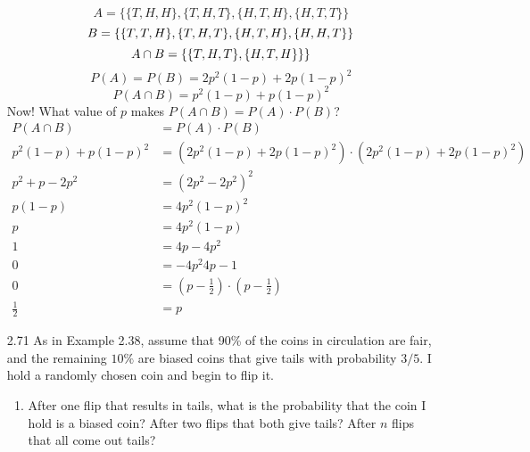 \documentclass[10pt]{article}
\begin{document}
\begin{itemize}
    \[ 
      A = \{ \{T,H,H\}, \{T,H,T\}, \{H,T,H\}, \{H,T,T \} \}
    \]
      \[
      B = \{ \{T,T,H\}, \{T,H,T\}, \{H,T,H\}, \{H,H,T \} \} \\
    \]
      \[
      A \cap B = \{ \{T,H,T\}, \{H,T,H\} \} \} \\
    \]
    \[ 
      P(A) = P(B) = 2p^2(1-p) + 2p(1-p)^2
    \]
    \[ 
      P(A \cap B) = p^2(1-p) + p(1-p)^2
    \]
    Now!  What value of $p$ makes $P(A \cap B) = P(A) \cdot P(B)$?
    \begin{align*}
      P(A \cap B) &= P(A) \cdot P(B) \\
      p^2(1-p) + p(1-p)^2 &= (2p^2(1-p) + 2p(1-p)^2) \cdot (2p^2(1-p) + 2p(1-p)^2) \\
      p^2+p -2p^2       &= (2p^2 -2p^2)^2 \\
      p(1 -p)      &= 4p^2(1-p)^2 \\
      p      &= 4p^2(1-p) \\
      1      &= 4p- 4p^2 \\
      0      &= - 4p^2 4p -1 \\
      0      &= (p - \frac{1}{2} ) \cdot (p - \frac{1}{2} ) \\
      \frac{1}{2} &= p
    \end{align*}
\newpage
  \item[2.71] As in Example 2.38, assume that 90\% of the coins in
    circulation are fair, and the remaining $10 \%$ are biased coins
    that give tails with probability $3 / 5$. I hold a randomly chosen
    coin and begin to flip it.
    \begin{enumerate}
      \item After one flip that results in tails, what is the
        probability that the coin I hold is a biased coin? After two
        flips that both give tails? After $n$ flips that all come out
        tails?


\end{enumerate}
\end{itemize}
\end{document}
